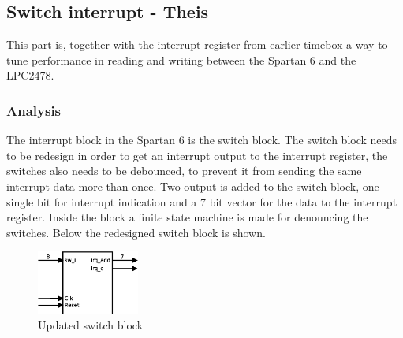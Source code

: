 \subsection{Switch interrupt - Theis}
%
This part is, together with the interrupt register from earlier timebox a way to tune performance in reading and writing between the Spartan 6 and the LPC2478.
\subsubsection{Analysis}
%
%
The interrupt block in the Spartan 6 is the switch block. The switch block needs to be redesign in order to get an interrupt output to the interrupt register, the switches also needs to be debounced, to prevent it from sending the same interrupt data more than once. Two output is added to the switch block, one single bit for interrupt indication and a 7 bit vector for the data to the interrupt register. Inside the block a finite state machine is made for denouncing the switches. Below the redesigned switch block is shown.

\begin{figure}[H]
	\begin{centering}
		\includegraphics[width=0.3\textwidth]{images/tb6_switchblock.eps}
		\caption{Updated switch block}
	\end{centering}
\end{figure}


